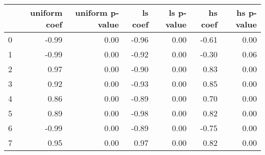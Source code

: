 \begin{tabular}{lrrrrrr}
\toprule
 & uniform coef & uniform p-value & ls coef & ls p-value & hs coef & hs p-value \\
\midrule
0 & -0.99 & 0.00 & -0.96 & 0.00 & -0.61 & 0.00 \\
1 & -0.99 & 0.00 & -0.92 & 0.00 & -0.30 & 0.06 \\
2 & 0.97 & 0.00 & -0.90 & 0.00 & 0.83 & 0.00 \\
3 & 0.92 & 0.00 & -0.93 & 0.00 & 0.85 & 0.00 \\
4 & 0.86 & 0.00 & -0.89 & 0.00 & 0.70 & 0.00 \\
5 & 0.89 & 0.00 & -0.98 & 0.00 & 0.82 & 0.00 \\
6 & -0.99 & 0.00 & -0.89 & 0.00 & -0.75 & 0.00 \\
7 & 0.95 & 0.00 & 0.97 & 0.00 & 0.82 & 0.00 \\
\bottomrule
\end{tabular}
